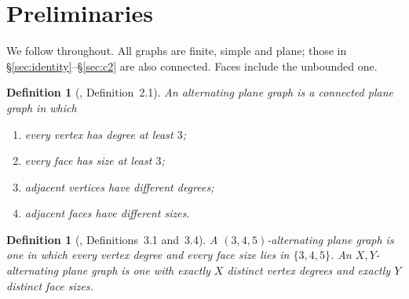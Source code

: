 \documentclass{baustms}
\theoremstyle{cupthm}
\theoremstyle{cupdefn}
\newtheorem{definition}[theorem]{Definition}
\theoremstyle{cuprem}
\begin{document}
\section{Preliminaries}\label{sec:prelim}

We follow \cite{AHSSV2015} throughout. All graphs are finite, simple and plane;
those in \S\ref{sec:identity}--\S\ref{sec:c2} are also connected. Faces include
the unbounded one.

\begin{definition}[\cite{AHSSV2015}, Definition~2.1]\label{def:apg}
An \emph{alternating plane graph} is a connected plane graph in which
\begin{enumerate}
  \item[(a)] every vertex has degree at least $3$;
  \item[(b)] every face has size at least $3$;
  \item[(c)] adjacent vertices have different degrees;
  \item[(d)] adjacent faces have different sizes.
\end{enumerate}
\end{definition}

\begin{definition}[\cite{AHSSV2015}, Definitions~3.1 and~3.4]
A $(3,4,5)$-alternating plane graph is one in which every vertex degree and
every face size lies in $\{3,4,5\}$. An \emph{$X,Y$-alternating plane graph} is
one with exactly $X$ distinct vertex degrees and exactly $Y$ distinct face
sizes.
\end{definition}
\end{document}
